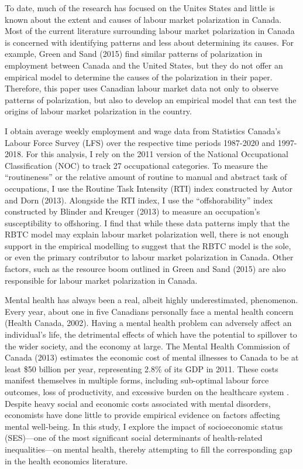 \documentclass[undefended]{bumrp}
\begin{document}
To date, much of the research has focused on the Unites States and little is known about the extent and causes of labour market polarization in Canada. Most of the current literature surrounding labour market polarization in Canada is concerned with identifying patterns and less about determining its causes. For example, Green and Sand (2015) find similar patterns of polarization in employment between Canada and the United States, but they do not offer an empirical model to determine the causes of the polarization in their paper.  Therefore, this paper uses Canadian labour market data not only to observe patterns of polarization, but also to develop an empirical model that can test the origins of labour market polarization in the country.

I obtain average weekly employment and wage data from Statistics Canada’s Labour Force Survey (LFS) over the respective time periods 1987-2020 and 1997-2018. For this analysis, I rely on the 2011 version of the National Occupational Classification (NOC) to track 27 occupational categories. To measure the “routineness” or the relative amount of routine to manual and abstract task of occupations,  I use the Routine Task Intensity (RTI) index constructed by Autor and Dorn (2013). Alongside the RTI index, I use the “offshorability” index constructed by Blinder and Kreuger (2013) to measure an occupation’s susceptibility to offshoring. I find that while these data patterns imply that the RBTC model may explain labour market polarization well, there is not enough support in the empirical modelling to suggest that the RBTC model is the sole, or even the primary contributor to labour market polarization in Canada. Other factors, such as the resource boom outlined in Green and Sand (2015) are also responsible for labour market polarization in Canada.




Mental health has always been a real, albeit highly underestimated, phenomenon. Every year, about one in five Canadians personally face a mental health concern (Health Canada, 2002). Having a mental health problem can adversely affect an individual’s life, the detrimental effects of which have the potential to spillover to the wider society, and the economy at large. The Mental Health Commission of Canada (2013) estimates the economic cost of mental illnesses to Canada to be at least \$50 billion per year, representing 2.8\% of its GDP in 2011. These costs manifest themselves in multiple forms, including sub-optimal labour force outcomes, loss of productivity, and excessive burden on the healthcare system \cite[][]{Stephens2001}. Despite heavy social and economic costs associated with mental disorders, economists have done little to provide empirical evidence on factors affecting mental well-being. In this study, I explore the impact of socioeconomic status (SES)—one of the most significant social determinants of health-related inequalities—on mental health, thereby attempting to fill the corresponding gap in the health economics literature.
\end{document}
